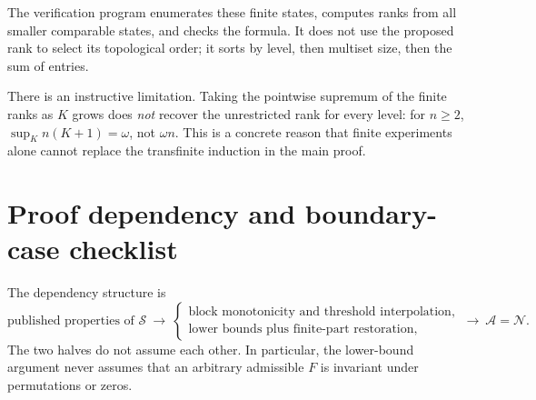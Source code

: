 \documentclass[11pt,letterpaper]{article}
\theoremstyle{definition}
\theoremstyle{remark}
\newcommand{\Nop}{\mathcal N}
\newcommand{\Sop}{\mathcal S}
\newcommand{\Aop}{\mathcal A}
\begin{document}
The verification program enumerates these finite states, computes ranks from all smaller comparable states, and checks the formula. It does not use the proposed rank to select its topological order; it sorts by level, then multiset size, then the sum of entries.

There is an instructive limitation. Taking the pointwise supremum of the finite ranks as $K$ grows does \emph{not} recover the unrestricted rank for every level: for $n\ge2$, $\sup_K n(K+1)=\omega$, not $\omega n$. This is a concrete reason that finite experiments alone cannot replace the transfinite induction in the main proof.

\section{Proof dependency and boundary-case checklist}\label{app:audit}

The dependency structure is
\[
 \text{published properties of }\Sop
 \ \longrightarrow\
 \begin{cases}
 \text{block monotonicity and threshold interpolation},\\
 \text{lower bounds plus finite-part restoration},
 \end{cases}
 \ \longrightarrow\ \Aop=\Nop.
\]
The two halves do not assume each other. In particular, the lower-bound argument never assumes that an arbitrary admissible $F$ is invariant under permutations or zeros.
\end{document}
